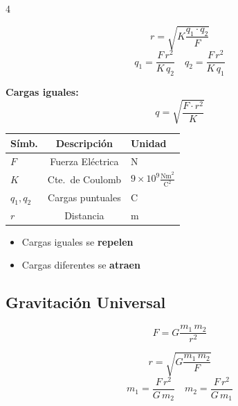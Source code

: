 \documentclass[9pt, landscape, letterpaper]{extarticle}
\begin{document}
\begin{multicols}{4}
  \begin{despejesbox}[Despejes]
    $$r = \sqrt{K \frac{q_1 \cdot q_2}{F}}$$
    $$q_1 = \frac{F\, r^2}{K\, q_2} \quad q_2 = \frac{F\, r^2}{K\, q_1}$$

    \textbf{Cargas iguales:}
    $$q = \sqrt{\frac{F \cdot r^2}{K}}$$
  \end{despejesbox}

  \begin{tablabox}[Variables]
    \tablacompacta
    \begin{tabular}{@{}lcl@{}}
      \toprule
      Símb.      & Descripción      & Unidad                                         \\
      \midrule
      $F$        & Fuerza Eléctrica & N                                              \\
      $K$        & Cte.\ de Coulomb & $9 \times 10^9 \frac{\text{Nm}^2}{\text{C}^2}$ \\
      $q_1, q_2$ & Cargas puntuales & C                                              \\
      $r$        & Distancia        & m                                              \\
      \bottomrule
    \end{tabular}
  \end{tablabox}

  \begin{notabox}
    \begin{itemize}
      \item Cargas iguales se \textbf{repelen}
      \item Cargas diferentes se \textbf{atraen}
    \end{itemize}
  \end{notabox}

  \subsection{Gravitación Universal}

  \begin{formulabox}
    $$F = G \frac{m_1\, m_2}{r^2}$$
  \end{formulabox}

  \begin{despejesbox}[Despejes]
    $$r = \sqrt{G \frac{m_1\, m_2}{F}}$$
    $$m_1 = \frac{F\, r^2}{G\, m_2} \quad m_2 = \frac{F\, r^2}{G\, m_1}$$
  \end{despejesbox}


\end{multicols}
\end{document}
